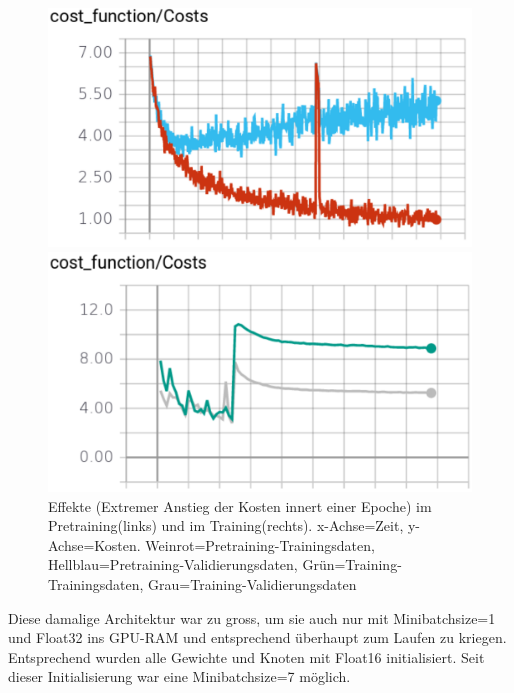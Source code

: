 \begin{figure}
	\centering
	\begin{minipage}[b]{0.48\textwidth}	
		\includegraphics[width=\textwidth]{Kapitel/40Architektur/Bilder/OverflowInPretraining.pdf}
	\end{minipage}
	\hfill
	\begin{minipage}[b]{0.48\textwidth}		
		\includegraphics[width=\textwidth]{Kapitel/40Architektur/Bilder/OverflowInTraining.pdf}
	\end{minipage}
			\caption{Effekte (Extremer Anstieg der Kosten innert einer Epoche) im Pretraining(links) und im Training(rechts). x-Achse=Zeit, y-Achse=Kosten. Weinrot=Pretraining-Trainingsdaten, Hellblau=Pretraining-Validierungsdaten, Grün=Training-Trainingsdaten, Grau=Training-Validierungsdaten}
	\label{img:Overflow}
\end{figure}



Diese damalige Architektur war zu gross, um sie auch nur mit Minibatchsize=1 und Float32 ins GPU-RAM und entsprechend überhaupt zum Laufen zu kriegen. 
Entsprechend wurden alle Gewichte und Knoten mit Float16 initialisiert. 
Seit dieser Initialisierung war eine Minibatchsize=7 möglich.

